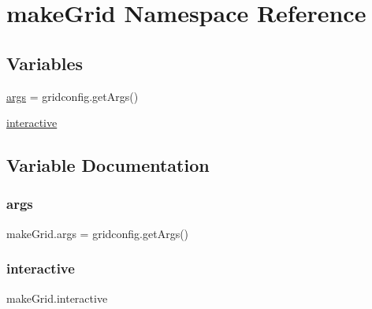 \hypertarget{namespacemakeGrid}{}\section{make\+Grid Namespace Reference}
\label{namespacemakeGrid}
\subsection*{Variables}
\begin{DoxyCompactItemize}
\item 
\mbox{\hyperlink{namespacemakeGrid_ad1d5f1cf9190a905688391e61338b23f}{args}} = gridconfig.\+get\+Args()
\item 
\mbox{\hyperlink{namespacemakeGrid_a6a0f359c18a8d8bfe01d7d67eef866a1}{interactive}}
\end{DoxyCompactItemize}


\subsection{Variable Documentation}
\mbox{\label{namespacemakeGrid_ad1d5f1cf9190a905688391e61338b23f}} 
\subsubsection{\texorpdfstring{args}{args}}
{\footnotesize\ttfamily make\+Grid.\+args = gridconfig.\+get\+Args()}

\mbox{\label{namespacemakeGrid_a6a0f359c18a8d8bfe01d7d67eef866a1}} 
\subsubsection{\texorpdfstring{interactive}{interactive}}
{\footnotesize\ttfamily make\+Grid.\+interactive}

